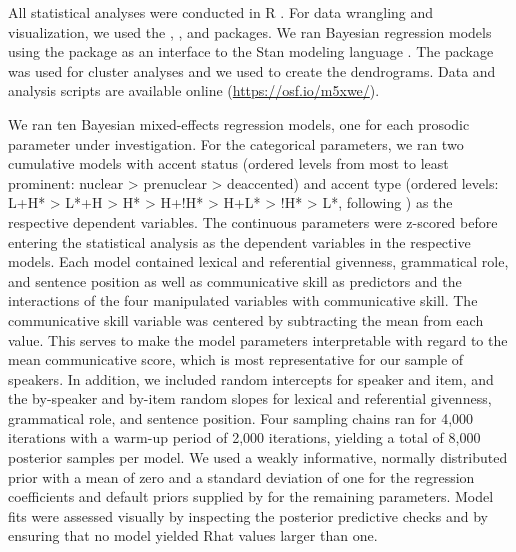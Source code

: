 All statistical analyses were conducted in R \citep{rcoreteamLanguageEnvironmentStatistical2022}. For data wrangling and visualization, we used the  \citep{wickhamWelcomeTidyverse2019},  \citep{wilkeCowplotStreamlinedPlot2020}, and  \citep{vandenbrandGgh4xHacksGgplot22024} packages. We ran Bayesian regression models using the  package \citep{burknerBrmsPackageBayesian2017} as an interface to the Stan modeling language \citep{carpenterStanProbabilisticProgramming2017}. The package  was used for cluster analyses \citep{maechlerClusterClusterAnalysis2022} and we used  \citep{devriesGgdendroCreateDendrograms2024} to create the dendrograms. Data and analysis scripts are available online (\url{https://osf.io/m5xwe/}).

We ran ten Bayesian mixed-effects regression models, one for each prosodic parameter under investigation. For the categorical parameters, we ran two cumulative models with accent status (ordered levels from most to least prominent: nuclear > prenuclear > deaccented) and accent type (ordered levels: L+H* > L*+H > H* > H+!H* > H+L* > !H* > L*, following \citealt{baumannPerceptualProminencePitch2015}) as the respective dependent variables. The continuous parameters were z-scored before entering the statistical analysis as the dependent variables in the respective models. Each model contained lexical and referential givenness, grammatical role, and sentence position as well as communicative skill as predictors and the interactions of the four manipulated variables with communicative skill. The communicative skill variable was centered by subtracting the mean from each value. This serves to make the model parameters interpretable with regard to the mean communicative score, which is most representative for our sample of speakers. In addition, we included random intercepts for speaker and item, and the by-speaker and by-item random slopes for lexical and referential givenness, grammatical role, and sentence position. Four sampling chains ran for 4,000 iterations with a warm-up period of 2,000 iterations, yielding a total of 8,000 posterior samples per model. We used a weakly informative, normally distributed prior with a mean of zero and a standard deviation of one for the regression coefficients and default priors supplied by  for the remaining parameters. Model fits were assessed visually by inspecting the posterior predictive checks and by ensuring that no model yielded Rhat values larger than one. 

